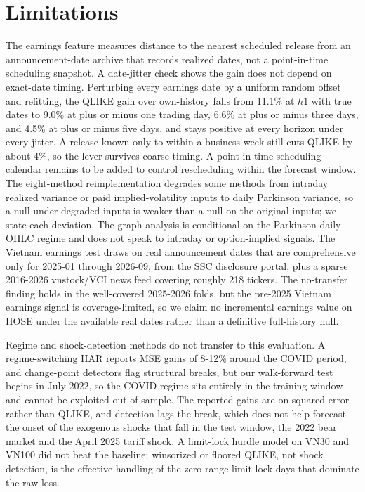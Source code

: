 \documentclass{llncs}
\begin{document}
\FloatBarrier
\section{Limitations}
The earnings feature measures distance to the nearest scheduled release from an announcement-date archive that
records realized dates, not a point-in-time scheduling snapshot. A date-jitter check shows the gain does not
depend on exact-date timing. Perturbing every earnings date by a uniform random offset and refitting, the QLIKE
gain over own-history falls from 11.1\% at $h1$ with true dates to 9.0\% at plus or minus one trading day, 6.6\% at
plus or minus three days, and 4.5\% at plus or minus five days, and stays positive at every horizon under every
jitter. A release known only to within a business week still cuts QLIKE by about 4\%, so the lever survives coarse
timing. A point-in-time scheduling calendar remains to be added to control rescheduling within the forecast
window. The eight-method
reimplementation degrades some methods from intraday realized variance or paid implied-volatility inputs to daily
Parkinson variance, so a null under degraded inputs is weaker than a null on the original inputs; we state each
deviation. The graph analysis is conditional on the Parkinson daily-OHLC regime and does not speak to intraday or
option-implied signals. The Vietnam earnings test draws on real announcement dates that are comprehensive only
for 2025-01 through 2026-09, from the SSC disclosure portal, plus a sparse 2016-2026 vnstock/VCI news feed
covering roughly 218 tickers. The no-transfer finding holds in the well-covered 2025-2026 folds, but the
pre-2025 Vietnam earnings signal is coverage-limited, so we claim no incremental earnings value on HOSE under the
available real dates rather than a definitive full-history null.

Regime and shock-detection methods do not transfer to this evaluation. A regime-switching HAR reports MSE gains
of 8-12\% around the COVID period, and change-point detectors flag structural breaks, but our walk-forward test
begins in July 2022, so the COVID regime sits entirely in the training window and cannot be exploited
out-of-sample. The reported gains are on squared error rather than QLIKE, and detection lags the break, which
does not help forecast the onset of the exogenous shocks that fall in the test window, the 2022 bear market and
the April 2025 tariff shock. A limit-lock hurdle model on VN30 and VN100 did not beat the baseline; winsorized or
floored QLIKE, not shock detection, is the effective handling of the zero-range limit-lock days that dominate the
raw loss.
\end{document}
